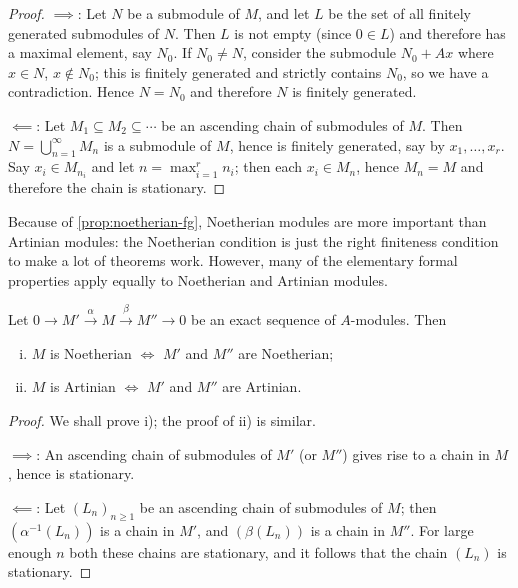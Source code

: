 \begin{proof}
$\implies$: Let $N$ be a submodule of $M$, and let $L$ be the set of all finitely generated submodules of $N$. Then $L$ is not empty (since $0 \in L$) and therefore has a maximal element, say $N_0$. If $N_0 \neq N$, consider the submodule $N_0 + Ax$ where $x \in N$, $x \notin N_0$; this is finitely generated and strictly contains $N_0$, so we have a contradiction. Hence $N = N_0$ and therefore $N$ is finitely generated.

$\impliedby$: Let $M_1 \subseteq M_2 \subseteq \cdots$ be an ascending chain of submodules of $M$. Then $N = \bigcup_{n=1}^\infty M_n$ is a submodule of $M$, hence is finitely generated, say by $x_1, \ldots, x_r$. Say $x_i \in M_{n_i}$ and let $n = \max_{i=1}^r n_i$; then each $x_i \in M_n$, hence $M_n = M$ and therefore the chain is stationary.
\end{proof}

Because of \eqref{prop:noetherian-fg}, Noetherian modules are more important than Artinian modules: the Noetherian condition is just the right finiteness condition to make a lot of theorems work. However, many of the elementary formal properties apply equally to Noetherian and Artinian modules.

\begin{proposition}\label{prop:exact-sequence}
    Let $0 \longrightarrow M' \stackrel{\alpha}{\longrightarrow} M \stackrel{\beta}{\longrightarrow} M'' \longrightarrow 0$ be an exact sequence of $A$-modules. Then
    \begin{enumerate}[i)]
        \item $M$ is Noetherian $\iff$ $M'$ and $M''$ are Noetherian;
        \item $M$ is Artinian $\iff$ $M'$ and $M''$ are Artinian.
    \end{enumerate}
\end{proposition}

\begin{proof}
We shall prove i); the proof of ii) is similar.

$\implies$: An ascending chain of submodules of $M'$ (or $M''$) gives rise to a chain in $M$, hence is stationary.

$\impliedby$: Let $(L_n)_{n \geq 1}$ be an ascending chain of submodules of $M$; then $(\alpha^{-1}(L_n))$ is a chain in $M'$, and $(\beta(L_n))$ is a chain in $M''$. For large enough $n$ both these chains are stationary, and it follows that the chain $(L_n)$ is stationary.
\end{proof}

